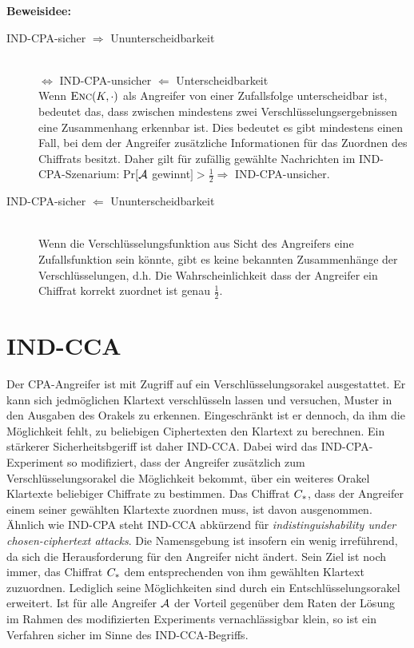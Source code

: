 \noindent
\textbf{Beweisidee:}
\begin{description}
	\item[IND-CPA-sicher $\Rightarrow$ Ununterscheidbarkeit]~\\
		$\Leftrightarrow$ IND-CPA-unsicher $\Leftarrow$ Unterscheidbarkeit~\\
		Wenn $\textsc{Enc}(K, \cdot)$ als Angreifer von einer Zufallsfolge unterscheidbar ist, bedeutet das, dass zwischen mindestens zwei Verschlüsselungsergebnissen eine Zusammenhang erkennbar ist. Dies bedeutet es gibt mindestens einen Fall, bei dem der Angreifer zusätzliche Informationen für das Zuordnen des Chiffrats besitzt. Daher gilt für zufällig gewählte Nachrichten im IND-CPA-Szenarium: Pr$[\mathcal{A}$ gewinnt$] > \frac{1}{2} \Rightarrow$ IND-CPA-unsicher.
	\item[IND-CPA-sicher $\Leftarrow$ Ununterscheidbarkeit]~\\
		Wenn die Verschlüsselungsfunktion aus Sicht des Angreifers eine Zufallsfunktion sein könnte, gibt es keine bekannten Zusammenhänge der Verschlüsselungen, d.h. Die Wahrscheinlichkeit dass der Angreifer ein Chiffrat korrekt zuordnet ist genau $\frac{1}{2}$.
\end{description}

\section{IND-CCA}
Der CPA-Angreifer ist mit Zugriff auf ein Verschlüsselungsorakel ausgestattet. Er kann sich jedmöglichen Klartext verschlüsseln lassen und
versuchen, Muster in den Ausgaben des Orakels zu erkennen. Eingeschränkt ist er dennoch, da ihm die Möglichkeit fehlt, zu beliebigen
Ciphertexten den Klartext zu berechnen. Ein stärkerer Sicherheitsbgeriff ist daher IND-CCA. Dabei wird das IND-CPA-Experiment
so modifiziert, dass der Angreifer zusätzlich zum Verschlüsselungsorakel die Möglichkeit bekommt, über ein weiteres Orakel Klartexte
beliebiger Chiffrate zu bestimmen. Das Chiffrat $C_*$, dass der Angreifer einem seiner gewählten Klartexte zuordnen muss, ist davon ausgenommen. Ähnlich wie IND-CPA steht IND-CCA abkürzend für \emph{indistinguishability under chosen-ciphertext attacks}. Die Namensgebung ist insofern ein wenig irreführend, da sich die Herausforderung für den Angreifer nicht ändert. Sein Ziel ist noch immer, das Chiffrat $C_*$ dem entsprechenden von ihm gewählten Klartext zuzuordnen. Lediglich seine Möglichkeiten sind durch ein Entschlüsselungsorakel erweitert.
Ist für alle Angreifer $\mathcal{A}$ der Vorteil gegenüber dem Raten der Lösung im Rahmen des modifizierten Experiments vernachlässigbar klein,
so ist ein Verfahren sicher im Sinne des IND-CCA-Begriffs.